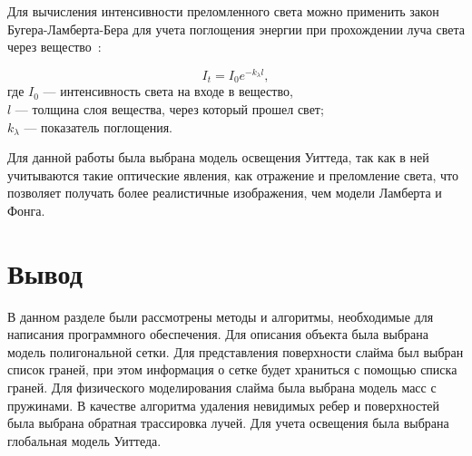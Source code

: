 Для вычисления интенсивности преломленного света можно применить
закон Бугера-Ламберта-Бера для учета поглощения энергии при прохождении луча
света через вещество~\cite{optics}:

\begin{equation}\label{blb}
	I_t = I_0 e^{-k_{\lambda} l},
\end{equation}
где $I_0$ --- интенсивность света на входе в вещество,\\
\text{~~~~~~}$l$ --- толщина слоя вещества, через который прошел свет;\\
\text{~~~~~~}$k_{\lambda}$ --- показатель поглощения.

Для данной работы была выбрана модель освещения Уиттеда, так как в ней учитываются такие оптические явления, как отражение и преломление света,
что позволяет получать более реалистичные изображения, чем модели
Ламберта и Фонга.

\section*{Вывод}

В данном разделе были рассмотрены методы и алгоритмы, необходимые для написания программного обеспечения. Для описания объекта была выбрана модель полигональной сетки. Для представления поверхности слайма был выбран список граней, при этом информация о сетке будет храниться с помощью списка граней. Для физического моделирования слайма была выбрана модель масс с пружинами. В качестве алгоритма удаления невидимых ребер и поверхностей была выбрана обратная трассировка лучей. Для учета освещения была выбрана глобальная модель Уиттеда.

\clearpage
